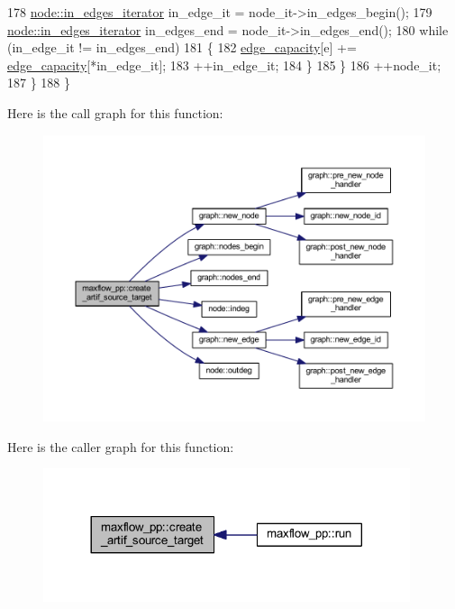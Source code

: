 \begin{DoxyCode}
178         \mbox{\hyperlink{classnode_a9a96be92add7c1a2771bcd0431ebf8ab}{node::in\_edges\_iterator}} in\_edge\_it = node\_it->in\_edges\_begin();
179         \mbox{\hyperlink{classnode_a9a96be92add7c1a2771bcd0431ebf8ab}{node::in\_edges\_iterator}} in\_edges\_end = node\_it->in\_edges\_end();
180         \textcolor{keywordflow}{while} (in\_edge\_it != in\_edges\_end)
181         \{
182         \mbox{\hyperlink{classmaxflow__pp_af3cdc4999a86322271a80b1855d58629}{edge\_capacity}}[e] += \mbox{\hyperlink{classmaxflow__pp_af3cdc4999a86322271a80b1855d58629}{edge\_capacity}}[*in\_edge\_it];
183         ++in\_edge\_it;
184         \}
185     \}
186     ++node\_it;
187     \}
188 \}
\end{DoxyCode}
Here is the call graph for this function\+:\nopagebreak
\begin{figure}[H]
\begin{center}
\leavevmode
\includegraphics[width=350pt]{classmaxflow__pp_a02438e89291eeccda0b247d20ffa11e5_cgraph}
\end{center}
\end{figure}
Here is the caller graph for this function\+:\nopagebreak
\begin{figure}[H]
\begin{center}
\leavevmode
\includegraphics[width=305pt]{classmaxflow__pp_a02438e89291eeccda0b247d20ffa11e5_icgraph}
\end{center}
\end{figure}
\mbox{\label{classmaxflow__pp_a20abf72dadaac19acb027ff5fa62de2a}} 
